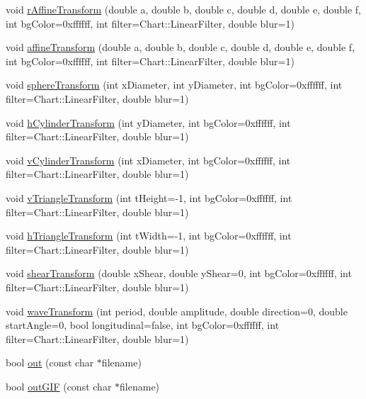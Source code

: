 \begin{DoxyCompactItemize}
\item 
void \hyperlink{class_draw_area_a321359fd3a279f7ede10d4998301cb89}{r\+Affine\+Transform} (double a, double b, double c, double d, double e, double f, int bg\+Color=0xffffff, int filter=\+Chart\+::\+Linear\+Filter, double blur=1)
\item 
void \hyperlink{class_draw_area_a343cccf1664650a3d120f58963ec0286}{affine\+Transform} (double a, double b, double c, double d, double e, double f, int bg\+Color=0xffffff, int filter=\+Chart\+::\+Linear\+Filter, double blur=1)
\item 
void \hyperlink{class_draw_area_ad29f4a2dca884baba7db6bed362f564e}{sphere\+Transform} (int x\+Diameter, int y\+Diameter, int bg\+Color=0xffffff, int filter=\+Chart\+::\+Linear\+Filter, double blur=1)
\item 
void \hyperlink{class_draw_area_aea6c02fec02392ac6d9dc1f3d663c7e3}{h\+Cylinder\+Transform} (int y\+Diameter, int bg\+Color=0xffffff, int filter=\+Chart\+::\+Linear\+Filter, double blur=1)
\item 
void \hyperlink{class_draw_area_ae618b60c8a4dca272d371588cdc9b71b}{v\+Cylinder\+Transform} (int x\+Diameter, int bg\+Color=0xffffff, int filter=\+Chart\+::\+Linear\+Filter, double blur=1)
\item 
void \hyperlink{class_draw_area_a2de5a0565d3611d6730a70cfe0f2718f}{v\+Triangle\+Transform} (int t\+Height=-\/1, int bg\+Color=0xffffff, int filter=\+Chart\+::\+Linear\+Filter, double blur=1)
\item 
void \hyperlink{class_draw_area_a24e00fc723cbe7b64fad7c51e4c10577}{h\+Triangle\+Transform} (int t\+Width=-\/1, int bg\+Color=0xffffff, int filter=\+Chart\+::\+Linear\+Filter, double blur=1)
\item 
void \hyperlink{class_draw_area_a547ec9c5a3dae897a4dce221132bbd09}{shear\+Transform} (double x\+Shear, double y\+Shear=0, int bg\+Color=0xffffff, int filter=\+Chart\+::\+Linear\+Filter, double blur=1)
\item 
void \hyperlink{class_draw_area_aa5f8289cb7562641389d28b799ff441e}{wave\+Transform} (int period, double amplitude, double direction=0, double start\+Angle=0, bool longitudinal=false, int bg\+Color=0xffffff, int filter=\+Chart\+::\+Linear\+Filter, double blur=1)
\item 
bool \hyperlink{class_draw_area_ae9ead4ed0341bb6dc724bed992f9f973}{out} (const char $\ast$filename)
\item 
bool \hyperlink{class_draw_area_aa4817265f2bffb24e1544cf45abf6213}{out\+G\+IF} (const char $\ast$filename)
\item 

\end{DoxyCompactItemize}
